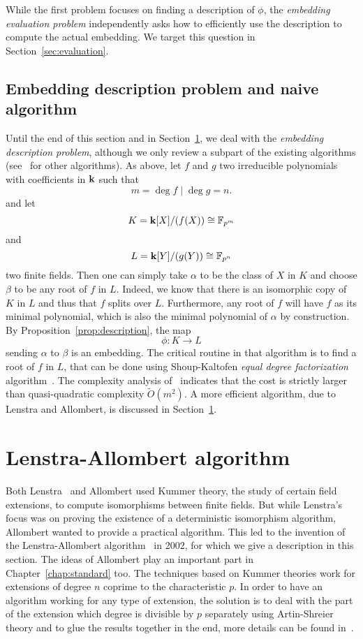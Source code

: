 While the first problem focuses on finding a description of $\phi$, the
\emph{embedding evaluation problem} independently asks how to efficiently use
the description to compute the actual embedding. We target this question in
Section~\ref{sec:evaluation}.

\subsection{Embedding description problem and naive algorithm}

Until the end of this section and in Section~\ref{sec:allombert}, we deal with
the \emph{embedding description problem}, although we only review a subpart of
the existing algorithms (see~\cite{BDDFS17} for other algorithms). As above, let
$f$ and $g$ two irreducible polynomials with coefficients in $\mathbf{k}$ such that
\[
  m=\deg f\mid \deg g=n.
\]
and let
\[
  K=\mathbf{k}[X]/(f(X))\cong\mathbb{F}_{p^m}
\]
and
\[
  L = \mathbf{k}[Y]/(g(Y))\cong\mathbb{F}_{p^n}
\]
two finite fields. Then one can simply take $\alpha$ to be the class of $X$ in
$K$ and choose $\beta$ to be any root of $f$ in $L$. Indeed, we know that there
is an isomorphic copy of $K$ in $L$ and thus that $f$ splits over $L$.
Furthermore, any root of $f$ will have $f$ as its minimal polynomial, which is
also the minimal polynomial of $\alpha$ by construction. By
Proposition~\ref{prop:description}, the map 
\[
  \phi:K\to L
\]
sending $\alpha$ to $\beta$ is an embedding. The critical routine in that
algorithm is to find a root of $f$ in $L$, that can be done using Shoup-Kaltofen
\emph{equal degree factorization} algorithm~\cite{KS97}. The complexity analysis
of~\cite{BDDFS17} indicates that the cost is strictly larger than quasi-quadratic
complexity $\tilde O(m^2)$. A more efficient algorithm, due to Lenstra and
Allombert, is discussed in Section~\ref{sec:allombert}.

\section{Lenstra-Allombert algorithm}
\label{sec:allombert}

Both Lenstra~\cite{Lenstra91} and Allombert used
Kummer theory, the study of certain field extensions, to compute isomorphisms
between finite fields. But while Lenstra's focus
was on proving the existence of a deterministic isomorphism algorithm, Allombert 
wanted to provide a practical algorithm. This led to the invention of the
Lenstra-Allombert algorithm~\cite{Allombert02} in 2002, for which we give a
description in this section. The ideas of Allombert play an important part in
Chapter~\ref{chap:standard} too. The techniques based on Kummer theories work
for extensions of degree $n$ coprime to the characteristic $p$. In order to have
an algorithm working for any type of extension, the solution is to deal with the
part of the extension which degree is divisible by $p$ separately using
Artin-Shreier theory and to glue the results together in the end, more details
can be found in~\cite[Section 3.2]{BDDFS17}.

